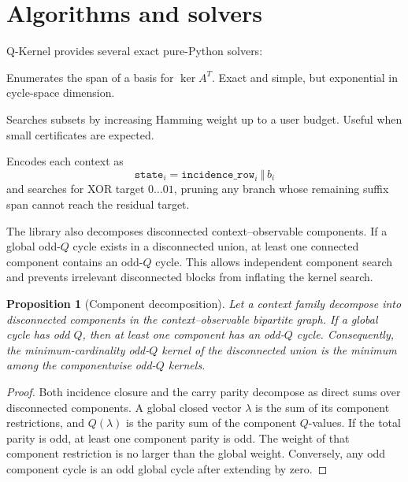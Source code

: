 \documentclass[11pt]{article}
\newtheorem{proposition}{Proposition}
\begin{document}
\section{Algorithms and solvers}

Q-Kernel provides several exact pure-Python solvers:
\begin{description}[leftmargin=*]
  \item[Cycle-span enumeration.] Enumerates the span of a basis for \(\ker A^T\).  Exact and simple, but exponential in cycle-space dimension.
  \item[Bounded-weight search.] Searches subsets by increasing Hamming weight up to a user budget.  Useful when small certificates are expected.
  \item[Branch-and-bound.] Encodes each context as
  \[
    \texttt{state}_i = \texttt{incidence\_row}_i\ \Vert\ b_i
  \]
  and searches for XOR target \(0\ldots01\), pruning any branch whose remaining suffix span cannot reach the residual target.
\end{description}

The library also decomposes disconnected context--observable components.  If a global odd-\(Q\) cycle exists in a disconnected union, at least one connected component contains an odd-\(Q\) cycle.  This allows independent component search and prevents irrelevant disconnected blocks from inflating the kernel search.

\begin{proposition}[Component decomposition]
\label{prop:component-decomposition}
Let a context family decompose into disconnected components in the context--observable bipartite graph.  If a global cycle has odd \(Q\), then at least one component has an odd-\(Q\) cycle.  Consequently, the minimum-cardinality odd-\(Q\) kernel of the disconnected union is the minimum among the componentwise odd-\(Q\) kernels.
\end{proposition}

\begin{proof}
Both incidence closure and the carry parity decompose as direct sums over disconnected components.  A global closed vector \(\lambda\) is the sum of its component restrictions, and \(Q(\lambda)\) is the parity sum of the component \(Q\)-values.  If the total parity is odd, at least one component parity is odd.  The weight of that component restriction is no larger than the global weight.  Conversely, any odd component cycle is an odd global cycle after extending by zero.
\end{proof}
\end{document}
